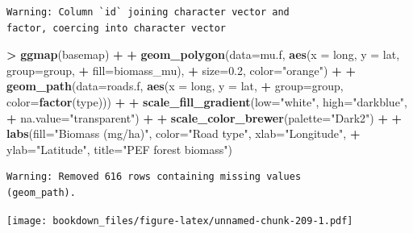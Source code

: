 \documentclass[]{krantz}
\makeatletter
\newenvironment{Shaded}{\begin{snugshade}}{\end{snugshade}}
\newcommand{\KeywordTok}[1]{\textcolor[rgb]{0.27,0.27,0.27}{\textbf{#1}}}
\newcommand{\DataTypeTok}[1]{\textcolor[rgb]{0.27,0.27,0.27}{#1}}
\newcommand{\FloatTok}[1]{\textcolor[rgb]{0.06,0.06,0.06}{#1}}
\newcommand{\StringTok}[1]{\textcolor[rgb]{0.5,0.5,0.5}{#1}}
\newcommand{\OperatorTok}[1]{\textcolor[rgb]{0.43,0.43,0.43}{\textbf{#1}}}
\newcommand{\NormalTok}[1]{#1}
\newenvironment{kframe}{%
\medskip{}
\setlength{\fboxsep}{.8em}
 \def\at@end@of@kframe{}%
 \ifinner\ifhmode%
  \def\at@end@of@kframe{\end{minipage}}%
  \begin{minipage}{\columnwidth}%
 \fi\fi%
 \def\FrameCommand##1{\hskip\@totalleftmargin \hskip-\fboxsep
 \colorbox{shadecolor}{##1}\hskip-\fboxsep
     \hskip-\linewidth \hskip-\@totalleftmargin \hskip\columnwidth}%
 \MakeFramed {\advance\hsize-\width
   \@totalleftmargin\z@ \linewidth\hsize
   \@setminipage}}%
 {\par\unskip\endMakeFramed%
 \at@end@of@kframe}
\renewenvironment{Shaded}{\begin{kframe}}{\end{kframe}}
\makeatother
\begin{document}
\begin{verbatim}
Warning: Column `id` joining character vector and
factor, coercing into character vector
\end{verbatim}

\begin{Shaded}
\begin{Highlighting}[]
\OperatorTok{>}\StringTok{ }\KeywordTok{ggmap}\NormalTok{(basemap) }\OperatorTok{+}
\OperatorTok{+}\StringTok{     }\KeywordTok{geom_polygon}\NormalTok{(}\DataTypeTok{data=}\NormalTok{mu.f, }\KeywordTok{aes}\NormalTok{(}\DataTypeTok{x =}\NormalTok{ long, }\DataTypeTok{y =}\NormalTok{ lat, }\DataTypeTok{group=}\NormalTok{group, }
\OperatorTok{+}\StringTok{                                 }\DataTypeTok{fill=}\NormalTok{biomass_mu), }
\OperatorTok{+}\StringTok{                  }\DataTypeTok{size=}\FloatTok{0.2}\NormalTok{, }\DataTypeTok{color=}\StringTok{"orange"}\NormalTok{) }\OperatorTok{+}
\OperatorTok{+}\StringTok{     }\KeywordTok{geom_path}\NormalTok{(}\DataTypeTok{data=}\NormalTok{roads.f, }\KeywordTok{aes}\NormalTok{(}\DataTypeTok{x =}\NormalTok{ long, }\DataTypeTok{y =}\NormalTok{ lat, }
\OperatorTok{+}\StringTok{                                 }\DataTypeTok{group=}\NormalTok{group, }\DataTypeTok{color=}\KeywordTok{factor}\NormalTok{(type))) }\OperatorTok{+}
\OperatorTok{+}\StringTok{     }\KeywordTok{scale_fill_gradient}\NormalTok{(}\DataTypeTok{low=}\StringTok{"white"}\NormalTok{, }\DataTypeTok{high=}\StringTok{"darkblue"}\NormalTok{, }
\OperatorTok{+}\StringTok{                         }\DataTypeTok{na.value=}\StringTok{"transparent"}\NormalTok{) }\OperatorTok{+}
\OperatorTok{+}\StringTok{     }\KeywordTok{scale_color_brewer}\NormalTok{(}\DataTypeTok{palette=}\StringTok{"Dark2"}\NormalTok{) }\OperatorTok{+}
\OperatorTok{+}\StringTok{     }\KeywordTok{labs}\NormalTok{(}\DataTypeTok{fill=}\StringTok{"Biomass (mg/ha)"}\NormalTok{, }\DataTypeTok{color=}\StringTok{"Road type"}\NormalTok{, }\DataTypeTok{xlab=}\StringTok{"Longitude"}\NormalTok{, }
\OperatorTok{+}\StringTok{          }\DataTypeTok{ylab=}\StringTok{"Latitude"}\NormalTok{, }\DataTypeTok{title=}\StringTok{"PEF forest biomass"}\NormalTok{)}
\end{Highlighting}
\end{Shaded}

\begin{verbatim}
Warning: Removed 616 rows containing missing values
(geom_path).
\end{verbatim}

\texttt{[image: bookdown\_files/figure-latex/unnamed-chunk-209-1.pdf]}
\end{document}
